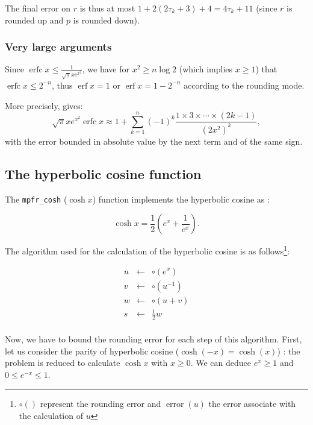 \documentclass[12pt]{amsart}
\DeclareMathOperator{\erf}{erf}
\DeclareMathOperator{\erfc}{erfc}
\DeclareMathOperator{\error}{error}
\begin{document}
The final error on $r$ is thus at most
$1 + 2 (2 \tau_k + 3) + 4 = 4 \tau_k + 11$
(since $r$ is rounded up and $p$ is rounded down).

\subsubsection{Very large arguments}

Since $\erfc x \leq \frac{1}{\sqrt{\pi} x e^{x^2}}$,
we have for $x^2 \geq n \log 2$ (which implies $x \geq 1$)
that $\erfc x \leq 2^{-n}$, thus
$\erf x = 1$ or $\erf x = 1 - 2^{-n}$ according to the rounding mode.

More precisely, \cite[formul{\ae} 7.1.23 and 7.1.24]{AbSt73} gives:
\[ \sqrt{\pi} x e^{x^2} \erfc x \approx
   1 + \sum_{k=1}^n (-1)^k \frac{1 \times 3 \times \cdots \times (2k-1)}
   {(2x^2)^k}, \]
with the error bounded in absolute value by the next term and of the same sign.

\subsection{The hyperbolic cosine function}

The {\tt mpfr\_cosh} ($\cosh{x}$) function implements the hyperbolic
cosine as :

\[\cosh x = \frac{1}{2} \left( e^{x} + \frac{1}{e^x} \right).\]

The algorithm used for the calculation of the hyperbolic cosine is as follows\footnote{$\circ()$ represent the rounding error and $\error(u)$ the
  error associate with the calculation of $u$}:

\begin{eqnarray}\nonumber
u&\leftarrow&\circ(e^x)\\\label{coshalgo1}
v&\leftarrow&\circ({u}^{-1})\\\label{coshalgo2}
w&\leftarrow&\circ(u+v)\\\label{coshalgo3}
s&\leftarrow&\frac{1}{2} w\\\label{coshalgo4}
\end{eqnarray}

Now, we have to bound the rounding error for each step of this
algorithm.  First, let us consider the parity of hyperbolic cosine
($\cosh(-x)=\cosh(x)$) : the problem is reduced to calculate $\cosh x$
with $x \geq 0$. We can deduce $e^x \geq 1$ and $0 \leq e^{-x} \leq
1$.
\end{document}
